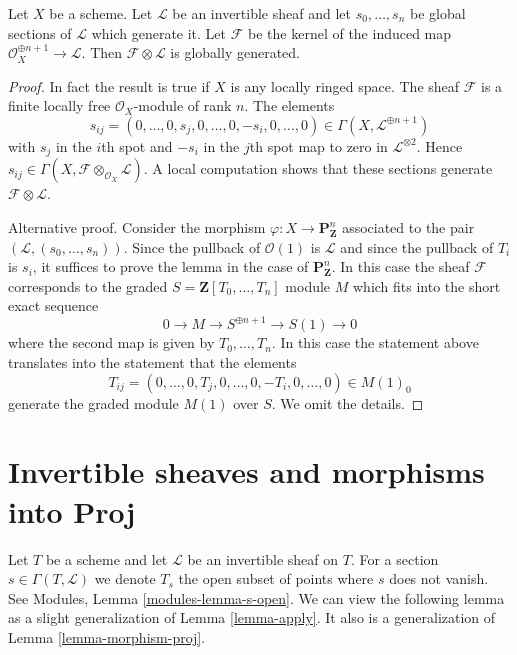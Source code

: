 \begin{lemma}
\label{lemma-globally-generated-omega-twist-1}
Let $X$ be a scheme. Let $\mathcal{L}$ be an invertible sheaf
and let $s_0, \ldots, s_n$ be global sections of $\mathcal{L}$
which generate it. Let $\mathcal{F}$ be the kernel of the induced
map $\mathcal{O}_X^{\oplus n + 1} \to \mathcal{L}$.
Then $\mathcal{F} \otimes \mathcal{L}$ is globally generated.
\end{lemma}

\begin{proof}
In fact the result is true if $X$ is any locally ringed space.
The sheaf $\mathcal{F}$ is a finite locally free $\mathcal{O}_X$-module
of rank $n$. The elements
$$
s_{ij} = (0, \ldots, 0, s_j, 0, \ldots, 0, -s_i, 0, \ldots, 0)
\in \Gamma(X, \mathcal{L}^{\oplus n + 1})
$$
with $s_j$ in the $i$th spot and $-s_i$ in the $j$th spot map to zero
in $\mathcal{L}^{\otimes 2}$. Hence
$s_{ij} \in \Gamma(X, \mathcal{F} \otimes_{\mathcal{O}_X} \mathcal{L})$.
A local computation shows that these sections generate
$\mathcal{F} \otimes \mathcal{L}$.

\medskip\noindent
Alternative proof. Consider the morphism
$\varphi : X \to \mathbf{P}^n_\mathbf{Z}$ associated to
the pair $(\mathcal{L}, (s_0, \ldots, s_n))$. Since the pullback
of $\mathcal{O}(1)$ is $\mathcal{L}$ and since the pullback
of $T_i$ is $s_i$, it suffices to prove the lemma in the
case of $\mathbf{P}^n_\mathbf{Z}$. In this case the sheaf
$\mathcal{F}$ corresponds to the graded $S = \mathbf{Z}[T_0, \ldots, T_n]$
module $M$ which fits into the short exact sequence
$$
0 \to M \to S^{\oplus n + 1} \to S(1) \to 0
$$
where the second map is given by $T_0, \ldots, T_n$. In this
case the statement above translates into the statement that
the elements
$$
T_{ij} = (0, \ldots, 0, T_j, 0, \ldots, 0, -T_i, 0, \ldots, 0)
\in M(1)_0
$$
generate the graded module $M(1)$ over $S$. We omit the details.
\end{proof}








\section{Invertible sheaves and morphisms into Proj}
\label{section-invertible-proj}

\noindent
Let $T$ be a scheme and let $\mathcal{L}$ be an invertible sheaf
on $T$. For a section $s \in \Gamma(T, \mathcal{L})$ we denote
$T_s$ the open subset of points where $s$ does not vanish. See
Modules, Lemma \ref{modules-lemma-s-open}. We can view the following
lemma as a slight generalization of Lemma \ref{lemma-apply}.
It also is a generalization of Lemma \ref{lemma-morphism-proj}.

